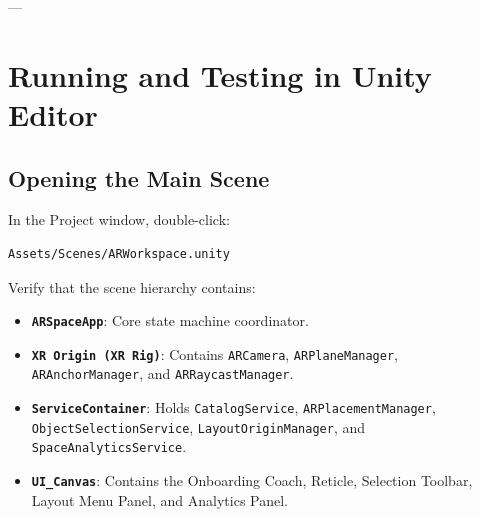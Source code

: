 \documentclass[11pt,a4paper]{article}
\begin{document}
---

\section{Running and Testing in Unity Editor}

\subsection{Opening the Main Scene}
In the Project window, double-click:
\begin{lstlisting}
Assets/Scenes/ARWorkspace.unity
\end{lstlisting}
Verify that the scene hierarchy contains:
\begin{itemize}[noitemsep]
    \item \textbf{\texttt{ARSpaceApp}}: Core state machine coordinator.
    \item \textbf{\texttt{XR Origin (XR Rig)}}: Contains \texttt{ARCamera}, \texttt{ARPlaneManager}, \texttt{ARAnchorManager}, and \texttt{ARRaycastManager}.
    \item \textbf{\texttt{ServiceContainer}}: Holds \texttt{CatalogService}, \texttt{ARPlacementManager}, \texttt{ObjectSelectionService}, \texttt{LayoutOriginManager}, and \texttt{SpaceAnalyticsService}.
    \item \textbf{\texttt{UI\_Canvas}}: Contains the Onboarding Coach, Reticle, Selection Toolbar, Layout Menu Panel, and Analytics Panel.
\end{itemize}
\end{document}
